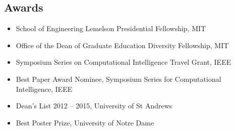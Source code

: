 \documentclass[line,margin]{cv}
\begin{document}
\begin{resume}
% 
% 
% 

\section{Awards}


\begin{itemize}

    \item School of Engineering Lemelson Presidential Fellowship, MIT
    \item Office of the Dean of Graduate Education Diversity Fellowship, MIT
    \item Symposium Series on Computational Intelligence Travel Grant, IEEE

\end{itemize}


\begin{itemize}

    \item Best Paper Award Nominee, Symposium Series for Computational
        Intelligence, IEEE
    \item Dean's List 2012 -- 2015, University of St Andrews
    \item Best Poster Prize, University of Notre Dame

\end{itemize}

%
%
%


\end{resume}
\end{document}
